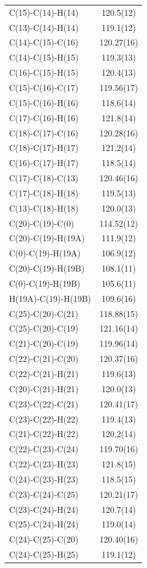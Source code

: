 \begin{center}
{\begin{supertabular}{p{1.5in}c}
C(15)-C(14)-H(14)&120.5(12)\\
C(13)-C(14)-H(14)&119.1(12)\\
C(14)-C(15)-C(16)&120.27(16)\\
C(14)-C(15)-H(15)&119.3(13)\\
C(16)-C(15)-H(15)&120.4(13)\\
C(15)-C(16)-C(17)&119.56(17)\\
C(15)-C(16)-H(16)&118.6(14)\\
C(17)-C(16)-H(16)&121.8(14)\\
C(18)-C(17)-C(16)&120.28(16)\\
C(18)-C(17)-H(17)&121.2(14)\\
C(16)-C(17)-H(17)&118.5(14)\\
C(17)-C(18)-C(13)&120.46(16)\\
C(17)-C(18)-H(18)&119.5(13)\\
C(13)-C(18)-H(18)&120.0(13)\\
C(20)-C(19)-C(0)&114.52(12)\\
C(20)-C(19)-H(19A)&111.9(12)\\
C(0)-C(19)-H(19A)&106.9(12)\\
C(20)-C(19)-H(19B)&108.1(11)\\
C(0)-C(19)-H(19B)&105.6(11)\\
H(19A)-C(19)-H(19B)&109.6(16)\\
C(25)-C(20)-C(21)&118.88(15)\\
C(25)-C(20)-C(19)&121.16(14)\\
C(21)-C(20)-C(19)&119.96(14)\\
C(22)-C(21)-C(20)&120.37(16)\\
C(22)-C(21)-H(21)&119.6(13)\\
C(20)-C(21)-H(21)&120.0(13)\\
C(23)-C(22)-C(21)&120.41(17)\\
C(23)-C(22)-H(22)&119.4(13)\\
C(21)-C(22)-H(22)&120.2(14)\\
C(22)-C(23)-C(24)&119.70(16)\\
C(22)-C(23)-H(23)&121.8(15)\\
C(24)-C(23)-H(23)&118.5(15)\\
C(23)-C(24)-C(25)&120.21(17)\\
C(23)-C(24)-H(24)&120.7(14)\\
C(25)-C(24)-H(24)&119.0(14)\\
C(24)-C(25)-C(20)&120.40(16)\\
C(24)-C(25)-H(25)&119.1(12)\\

\end{supertabular}}
\end{center}
